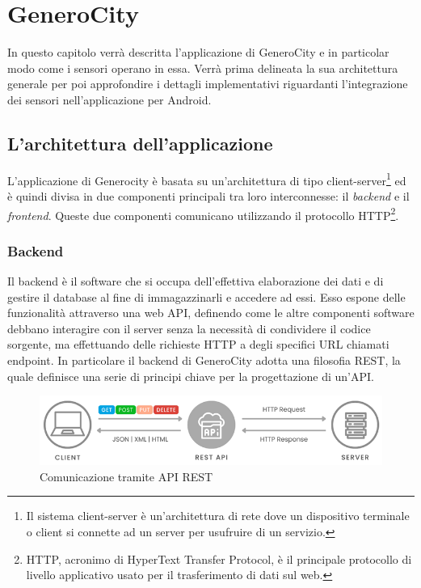 \chapter{GeneroCity}

In questo capitolo verrà descritta l'applicazione di GeneroCity e in particolar modo come i sensori operano in essa. Verrà prima delineata la sua architettura generale per poi approfondire i dettagli implementativi riguardanti l'integrazione dei sensori nell'applicazione per Android. 

\section{L'architettura dell'applicazione}
L'applicazione di Generocity è basata su un'architettura di tipo client-server\footnote{Il sistema client-server è un'architettura di rete dove un dispositivo terminale o client si connette ad un server per usufruire di un servizio.} ed è quindi divisa in due componenti principali tra loro interconnesse: il \textit{backend} e il \textit{frontend}. Queste due componenti comunicano  utilizzando il protocollo HTTP\footnote{HTTP, acronimo di HyperText Transfer Protocol, è il principale protocollo di livello applicativo usato per il trasferimento di dati sul web.}.

\subsection{Backend}
Il backend è il software che si occupa dell'effettiva elaborazione dei dati e di gestire il database al fine di immagazzinarli e accedere ad essi. Esso espone delle funzionalità attraverso una web API, definendo come le altre componenti software debbano interagire con il server senza la necessità di condividere il codice sorgente, ma effettuando delle richieste HTTP a degli specifici URL chiamati endpoint. In particolare il backend di GeneroCity adotta una filosofia REST, la quale definisce una serie di principi chiave per la progettazione di un'API.
\begin{figure}[h]
    \centering
    \includegraphics[width=1\linewidth]{images/rest.png}
    \caption{Comunicazione tramite API REST}
    \label{fig:rest}
\end{figure}


